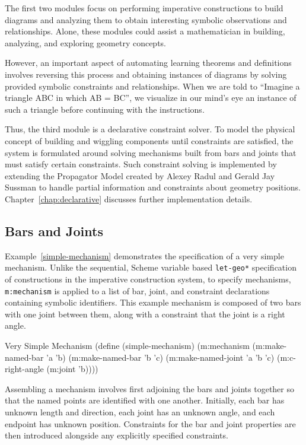 The first two modules focus on performing imperative constructions to
build diagrams and analyzing them to obtain interesting symbolic
observations and relationships. Alone, these modules could assist a
mathematician in building, analyzing, and exploring geometry concepts.

However, an important aspect of automating learning theorems and
definitions involves reversing this process and obtaining instances of
diagrams by solving provided symbolic constraints and
relationships. When we are told to ``Imagine a triangle ABC in which
AB = BC'', we visualize in our mind's eye an instance of such a
triangle before continuing with the instructions.

Thus, the third module is a declarative constraint solver. To model
the physical concept of building and wiggling components until
constraints are satisfied, the system is formulated around solving
mechanisms built from bars and joints that must satisfy certain
constraints. Such constraint solving is implemented by extending the
Propagator Model created by Alexey Radul and Gerald Jay Sussman
\cite{gjs-propagator} to handle partial information and constraints
about geometry positions. Chapter~\ref{chap:declarative} discusses
further implementation details.

\subsection{Bars and Joints}

Example~\ref{simple-mechanism} demonstrates the specification of a
very simple mechanism. Unlike the sequential, Scheme variable based
\texttt{let-geo*} specification of constructions in the imperative
construction system, to specify mechanisms, \texttt{m:mechanism} is
applied to a list of bar, joint, and constraint declarations
containing symbolic identifiers.  This example mechanism is composed
of two bars with one joint between them, along with a constraint that
the joint is a right angle.

\begin{code-example}
[label=simple-mechanism]
{Very Simple Mechanism}
(define (simple-mechanism)
  (m:mechanism
   (m:make-named-bar 'a 'b)
   (m:make-named-bar 'b 'c)
   (m:make-named-joint 'a 'b 'c)
   (m:c-right-angle (m:joint 'b))))
\end{code-example}

Assembling a mechanism involves first adjoining the bars and joints
together so that the named points are identified with one another.
Initially, each bar has unknown length and direction, each joint has
an unknown angle, and each endpoint has unknown position. Constraints
for the bar and joint properties are then introduced alongside any
explicitly specified constraints.

